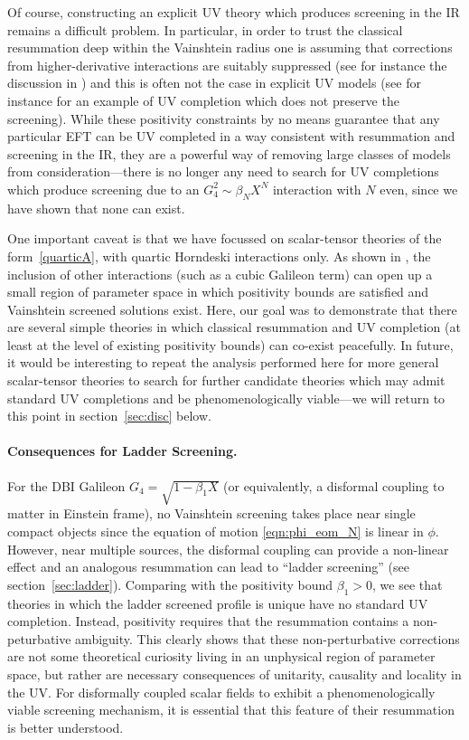 \documentclass[11pt]{article}
\begin{document}
Of course, constructing an explicit UV theory which produces screening in the IR remains a difficult problem. In particular, in order to trust the classical resummation deep within the Vainshtein radius one is assuming that corrections from higher-derivative interactions are suitably suppressed (see for instance the discussion in \cite{deRham:2017xox}) and this is often not the case in explicit UV models (see for instance \cite{Burrage:2020bxp} for an example of UV completion which does not preserve the screening). 
While these positivity constraints by no means guarantee that any particular EFT can be UV completed in a way consistent with resummation and screening in the IR, they are a powerful way of removing large classes of models from consideration---there is no longer any need to search for UV completions which produce screening due to an $G_4^2 \sim \beta_N X^N$ interaction with $N$ even, since we have shown that none can exist.    

One important caveat is that we have focussed on scalar-tensor theories of the form~\eqref{quarticA}, with quartic Horndeski interactions only. 
As shown in \cite{deRham:2017imi}, the inclusion of other interactions (such as a cubic Galileon term) can open up a small region of parameter space in which positivity bounds are satisfied and Vainshtein screened solutions exist. 
Here, our goal was to demonstrate that there are several simple theories in which classical resummation and UV completion (at least at the level of existing positivity bounds) can co-exist peacefully. 
In future, it would be interesting to repeat the analysis performed here for more general scalar-tensor theories to search for further candidate theories which may admit standard UV completions and be phenomenologically viable---we will return to this point in section~\ref{sec:disc} below.


\paragraph{Consequences for Ladder Screening.}
For the DBI Galileon $G_4 = \sqrt{1 - \beta_1 X}$ (or equivalently, a disformal coupling to matter in Einstein frame), no Vainshtein screening takes place near single compact objects since the equation of motion \eqref{eqn:phi_eom_N} is linear in $\phi$. 
However, near multiple sources, the disformal coupling can provide a non-linear effect and an analogous resummation can lead  to ``ladder screening'' \cite{Davis:2019ltc} (see section~\ref{sec:ladder}). 
Comparing with the positivity bound $\beta_1  > 0$, we see that theories in which the ladder screened profile is unique have no standard UV completion. 
Instead, positivity requires that the resummation contains a non-peturbative ambiguity.
This clearly shows that these non-perturbative corrections are not some theoretical curiosity living in an unphysical region of parameter space, but rather are necessary consequences of unitarity, causality and locality in the UV. 
For disformally coupled scalar fields to exhibit a phenomenologically viable screening mechanism, it is essential that this feature of their resummation is better understood. 
\end{document}
